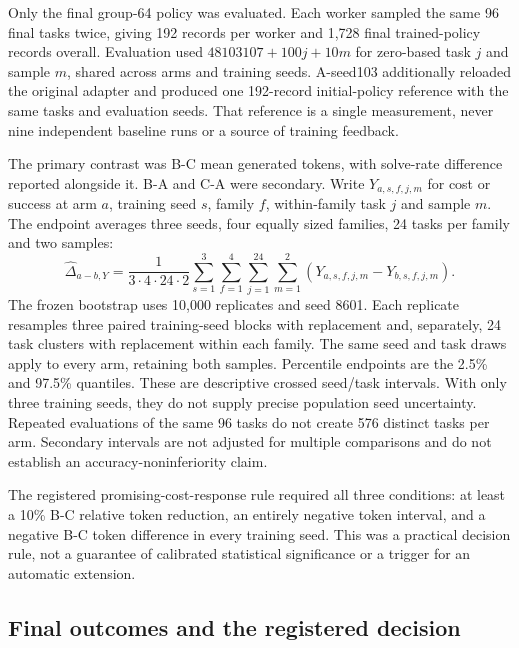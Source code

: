 \documentclass[11pt]{article}
\begin{document}
Only the final group-64 policy was evaluated. Each worker sampled the same 96 final tasks twice, giving 192 records per worker and 1,728 final trained-policy records overall. Evaluation used $48103107+100j+10m$ for zero-based task $j$ and sample $m$, shared across arms and training seeds. A-seed103 additionally reloaded the original adapter and produced one 192-record initial-policy reference with the same tasks and evaluation seeds. That reference is a single measurement, never nine independent baseline runs or a source of training feedback.

The primary contrast was B-C mean generated tokens, with solve-rate difference reported alongside it. B-A and C-A were secondary. Write $Y_{a,s,f,j,m}$ for cost or success at arm $a$, training seed $s$, family $f$, within-family task $j$ and sample $m$. The endpoint averages three seeds, four equally sized families, 24 tasks per family and two samples:
\begin{equation}
 \widehat\Delta_{a-b,Y}=\frac1{3\cdot4\cdot24\cdot2}
 \sum_{s=1}^3\sum_{f=1}^4\sum_{j=1}^{24}\sum_{m=1}^2
   (Y_{a,s,f,j,m}-Y_{b,s,f,j,m}).
\end{equation}
The frozen bootstrap uses 10,000 replicates and seed 8601. Each replicate resamples three paired training-seed blocks with replacement and, separately, 24 task clusters with replacement within each family. The same seed and task draws apply to every arm, retaining both samples. Percentile endpoints are the 2.5\% and 97.5\% quantiles. These are descriptive crossed seed/task intervals. With only three training seeds, they do not supply precise population seed uncertainty. Repeated evaluations of the same 96 tasks do not create 576 distinct tasks per arm. Secondary intervals are not adjusted for multiple comparisons and do not establish an accuracy-noninferiority claim.

The registered promising-cost-response rule required all three conditions: at least a 10\% B-C relative token reduction, an entirely negative token interval, and a negative B-C token difference in every training seed. This was a practical decision rule, not a guarantee of calibrated statistical significance or a trigger for an automatic extension.

\subsection{Final outcomes and the registered decision}
\end{document}
